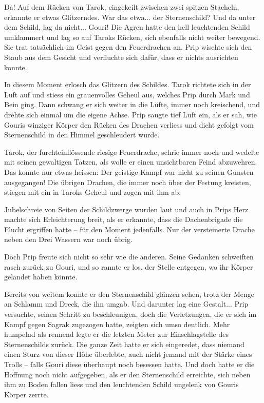 \documentclass[10pt, a4paper, oneside]{book}
\begin{document}
Da! Auf dem Rücken von Tarok, eingekeilt zwischen zwei spitzen Stacheln, erkannte er etwas Glitzerndes. War das etwa... der Sternenschild? Und da unter dem Schild, lag da nicht... Gouri! Die Agren hatte den hell leuchtenden Schild umklammert und lag so auf Taroks Rücken, sich ebenfalls nicht weiter bewegend. Sie trat tatsächlich im Geist gegen den Feuerdrachen an. Prip wischte sich den Staub aus dem Gesicht und verfluchte sich dafür, dass er nichts ausrichten konnte.

In diesem Moment erlosch das Glitzern des Schildes. Tarok richtete sich in der Luft auf und stiess ein grauenvolles Geheul aus, welches Prip durch Mark und Bein ging. Dann schwang er sich weiter in die Lüfte, immer noch kreischend, und drehte sich einmal um die eigene Achse. Prip saugte tief Luft ein, als er sah, wie Gouris winziger Körper den Rücken des Drachen verliess und dicht gefolgt vom Sternenschild in den Himmel geschleudert wurde.

Tarok, der furchteinflössende riesige Feuerdrache, schrie immer noch und wedelte mit seinen gewaltigen Tatzen, als wolle er einen unsichtbaren Feind abzuwehren. Das konnte nur etwas heissen: Der geistige Kampf war nicht zu seinen Gunsten ausgegangen! Die übrigen Drachen, die immer noch über der Festung kreisten, stiegen mit ein in Taroks Geheul und zogen mit ihm ab.

Jubelschreie von Seiten der Schildzwerge wurden laut und auch in Prips Herz machte sich Erleichterung breit, als er erkannte, dass die Dachenbrigade die Flucht ergriffen hatte – für den Moment jedenfalls. Nur der versteinerte Drache neben den Drei Wassern war noch übrig.

Doch Prip freute sich nicht so sehr wie die anderen. Seine Gedanken schweiften rasch zurück zu Gouri, und so rannte er los, der Stelle entgegen, wo ihr Körper gelandet haben könnte.

Bereits von weitem konnte er den Sternenschild glänzen sehen, trotz der Menge an Schlamm und Dreck, die ihn umgab. Und darunter lag eine Gestalt... Prip versuchte, seinen Schritt zu beschleunigen, doch die Verletzungen, die er sich im Kampf gegen Sagrak zugezogen hatte, zeigten sich umso deutlich. Mehr humpelnd als rennend legte er die letzten Meter zur Einschlagstelle des Sternenschilds zurück. Die ganze Zeit hatte er sich eingeredet, dass niemand einen Sturz von dieser Höhe überlebte, auch nicht jemand mit der Stärke eines Trolls – falls Gouri diese überhaupt noch besessen hatte. Und doch hatte er die Hoffnung noch nicht aufgegeben, als er den Sternenschild erreichte, sich neben ihm zu Boden fallen liess und den leuchtenden Schild ungelenk von Gouris Körper zerrte.
\end{document}

